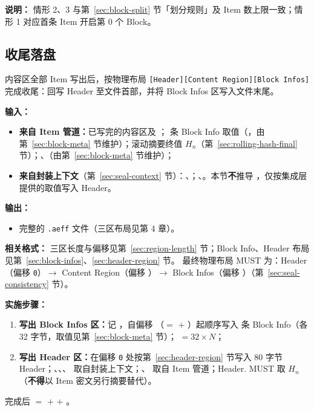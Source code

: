 \textbf{说明：}
情形 2、3 与第~\ref{sec:block-split} 节「划分规则」及 Item 数上限一致；情形 1 对应首条 Item 开启第 0 个 Block。

\subsection{收尾落盘}\label{sec:seal-finalize}
内容区全部 Item 写出后，按物理布局 \texttt{[Header][Content Region][Block Infos]} 完成收尾：回写 Header 至文件首部，并将 Block Infos 区写入文件末尾。

\textbf{输入：}
\begin{itemize}
  \item \textbf{来自 Item 管道：}已写完的内容区及 ； 条 Block Info 取值（，由第~\ref{sec:block-meta} 节维护）；滚动摘要终值 $H_n$（第~\ref{sec:rolling-hash-final} 节）；、（由第~\ref{sec:block-meta} 节维护）；
  \item \textbf{来自封装上下文}（第~\ref{sec:seal-context} 节）：、；、。本节\textbf{不}推导 ，仅按集成层提供的取值写入 Header。
\end{itemize}

\textbf{输出：}
\begin{itemize}
  \item 完整的 \texttt{.aeff} 文件（三区布局见第 4 章）。
\end{itemize}

\textbf{相关格式：}
三区长度与偏移见第~\ref{sec:region-length} 节；Block Info、Header 布局见第~\ref{sec:block-infos}、\ref{sec:header-region} 节。
最终物理布局 MUST 为：Header（偏移 \texttt{0}）$\rightarrow$ Content Region（偏移 ）$\rightarrow$ Block Infos（偏移 ）（第~\ref{sec:seal-consistency} 节）。

\textbf{实施步骤：}
\begin{enumerate}
  \item \textbf{写出 Block Infos 区：}记 ，自偏移 （$=$  $+$ ）起顺序写入  条 Block Info（各 32 字节，取值见第~\ref{sec:block-meta} 节）； $= 32 \times N$；
  \item \textbf{写出 Header 区：}在偏移 \texttt{0} 处按第~\ref{sec:header-region} 节写入 80 字节 Header；、、、 取自封装上下文；、 取自 Item 管道；Header. MUST 取 $H_n$（\textbf{不得}以 Item 密文另行摘要替代）。
\end{enumerate}
完成后  $=$  $+$  $+$ 。

